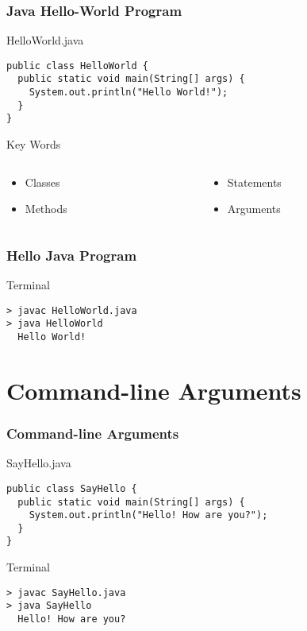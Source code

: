 \documentclass[10pt, compress]{beamer}
\begin{document}
\begin{frame}[fragile]
	\frametitle{Java Hello-World Program}
	\begin{block}{HelloWorld.java}
		\begin{verbatim}
public class HelloWorld {
  public static void main(String[] args) {
    System.out.println("Hello World!");
  }
}
		\end{verbatim}
	\end{block}
	\pause
	\begin{block}{Key Words}
		\begin{columns}
		\begin{column}{0.5\textwidth}
			\begin{itemize}
				\item[] Classes
				\item[] Methods
			\end{itemize}
		\end{column}
		\begin{column}{0.5\textwidth}
			\begin{itemize}
				\item[] Statements
				\item[] Arguments
			\end{itemize}
		\end{column}
		\end{columns}
	\end{block}
\end{frame}

\begin{frame}[fragile]
	\frametitle{Hello Java Program}
	\begin{block}{Terminal}
		\begin{verbatim}
> javac HelloWorld.java
> java HelloWorld
  Hello World!
		\end{verbatim}
	\end{block}
\end{frame}

\section{Command-line Arguments}

\begin{frame}[fragile]
	\frametitle{Command-line Arguments}
	\begin{block}{SayHello.java}
		\begin{verbatim}
public class SayHello {
  public static void main(String[] args) {
    System.out.println("Hello! How are you?");
  }
}
		\end{verbatim}
	\end{block}
	\begin{block}{Terminal}
		\begin{verbatim}
> javac SayHello.java
> java SayHello
  Hello! How are you?
		\end{verbatim}
	\end{block}
\end{frame}
\end{document}

